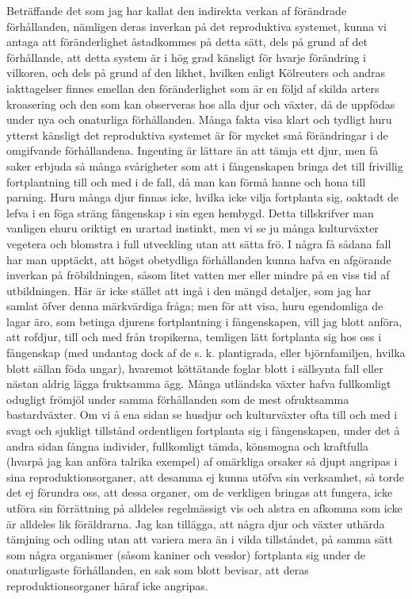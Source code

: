 Beträffande det som jag har kallat den indirekta verkan af förändrade förhållanden, nämligen deras inverkan på det reproduktiva systemet, kunna vi antaga att föränderlighet åstadkommes på detta sätt, dels på grund af det förhållande, att detta system är i hög grad känsligt för hvarje förändring i vilkoren, och dels på grund af den likhet, hvilken enligt Kölreuters och andras iakttagelser finnes emellan den föränderlighet som är en följd af skilda arters kroasering och den som kan observeras hos alla djur och växter, då de uppfödas under nya och onaturliga förhållanden. Många fakta visa klart och tydligt huru ytterst känsligt det reproduktiva systemet är för mycket små förändringar i de omgifvande förhållandena. Ingenting är lättare än att tämja ett djur, men få saker erbjuda så många svårigheter som att i fångenskapen bringa det till frivillig fortplantning till och med i de fall, då man kan förmå hanne och hona till parning. Huru många djur finnas icke, hvilka icke vilja fortplanta sig, oaktadt de lefva i en föga sträng fångenskap i sin egen hembygd. Detta tillskrifver man vanligen ehuru oriktigt en urartad instinkt, men vi se ju många kulturväxter vegetera och blomstra i full utveckling utan att sätta frö. I några få sådana fall har man upptäckt, att högst obetydliga förhållanden kunna hafva en afgörande inverkan på fröbildningen, såsom litet vatten mer eller mindre på en viss tid af utbildningen. Här är icke stället att ingå i den mängd detaljer, som jag har samlat öfver denna märkvärdiga fråga; men för att visa, huru egendomliga de lagar äro, som betinga djurens fortplantning i fångenskapen, vill jag blott anföra, att rofdjur, till och med från tropikerna, temligen lätt fortplanta sig hos oss i fångenskap (med undantag dock af de s. k. plantigrada, eller björnfamiljen, hvilka blott sällan föda ungar), hvaremot köttätande foglar blott i sällsynta fall eller nästan aldrig lägga fruktsamma ägg. Många utländska växter hafva fullkomligt odugligt frömjöl under samma förhållanden som de mest ofruktsamma bastardväxter. Om vi å ena sidan se husdjur och kulturväxter ofta till och med i svagt och sjukligt tillstånd ordentligen fortplanta sig i fångenskapen, under det å andra sidan fångna individer, fullkomligt tämda, könsmogna och kraftfulla (hvarpå jag kan anföra talrika exempel) af omärkliga orsaker så djupt angripas i sina reproduktionsorganer, att desamma ej kunna utöfva sin verksamhet, så torde det ej förundra oss, att dessa organer, om de verkligen bringas att fungera, icke utföra sin förrättning på alldeles regelmässigt vis och alstra en afkomma som icke är alldeles lik föräldrarna. Jag kan tillägga, att några djur och växter uthärda tämjning och odling utan att variera mera än i vilda tillståndet, på samma sätt som några organismer (såsom kaniner och vesslor) fortplanta sig under de onaturligaste förhållanden, en sak som blott bevisar, att deras reproduktionsorganer häraf icke angripas.

